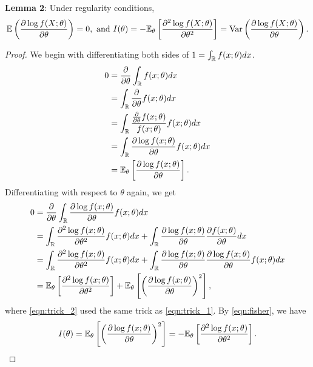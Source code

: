 $ $\\
\textbf{Lemma 2}: Under regularity conditions, 
\begin{align}
\mathbb{E}\left( \frac{\partial\log f(X;\theta)}{\partial \theta} \right) = 0, \text{ and }
I(\theta) = -\mathbb{E}_\theta\left[ \frac{\partial^2\log f(X;\theta)}{\partial \theta^2} \right] = \text{Var}\left( \frac{\partial\log f(X;\theta)}{\partial \theta} \right).
\end{align}
\begin{proof}
We begin with differentiating both sides of $1 = \int_{\mathbb{R}} f(x;\theta) dx$.
\begin{align}
0 &= \frac{\partial}{\partial\theta}\int_{\mathbb{R}} f(x;\theta)dx\\
&= \int_{\mathbb{R}} \frac{\partial}{\partial\theta} f(x;\theta)dx\\
&= \int_{\mathbb{R}} \frac{\frac{\partial}{\partial\theta} f(x;\theta)}{f(x;\theta)}f(x;\theta) dx\\
&= \int_{\mathbb{R}} \frac{\partial \log f(x;\theta)}{\partial\theta}f(x;\theta) dx \label{eqn:trick_1} \\
&= \mathbb{E}_\theta\left[ \frac{\partial \log f(x;\theta)}{\partial\theta} \right].
\end{align}
Differentiating with respect to $\theta$ again, we get
\begin{align}
0 &= \frac{\partial}{\partial\theta}\int_{\mathbb{R}} \frac{\partial \log f(x;\theta)}{\partial\theta}f(x;\theta) dx\\
&= \int_{\mathbb{R}} \frac{\partial^2 \log f(x;\theta)}{\partial\theta^2}f(x;\theta) dx + \int_{\mathbb{R}} \frac{\partial \log f(x;\theta)}{\partial\theta}\frac{\partial f(x;\theta)}{\partial\theta} dx\\
&= \int_{\mathbb{R}} \frac{\partial^2 \log f(x;\theta)}{\partial\theta^2}f(x;\theta) dx + \int_{\mathbb{R}} \frac{\partial \log f(x;\theta)}{\partial\theta}\frac{\partial \log f(x;\theta)}{\partial\theta}f(x;\theta) dx \label{eqn:trick_2} \\
&= \mathbb{E}_\theta\left[ \frac{\partial^2 \log f(x;\theta)}{\partial\theta^2} \right] + \mathbb{E}_\theta\left[ \left(\frac{\partial \log f(x;\theta)}{\partial\theta}\right)^2 \right],
\end{align}
where \cref{eqn:trick_2} used the same trick as \cref{eqn:trick_1}. By \cref{eqn:fisher}, we have
\begin{align}
I(\theta) = \mathbb{E}_\theta\left[ \left(\frac{\partial \log f(x;\theta)}{\partial\theta}\right)^2 \right] = -\mathbb{E}_\theta\left[ \frac{\partial^2 \log f(x;\theta)}{\partial\theta^2} \right].
\end{align}

\end{proof}

